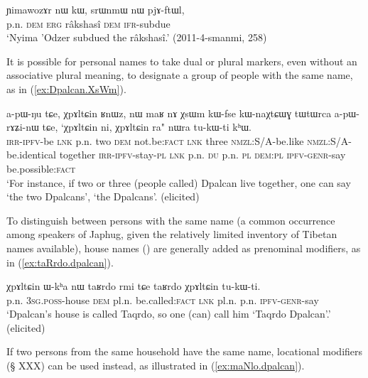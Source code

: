\begin{exe}
\ex \label{ex:Yimawodzer.NW}
 \gll  ɲimawozɤr nɯ kɯ, srɯnmɯ nɯ pjɤ-ftɯl, \\
 p.n. \textsc{dem} \textsc{erg} râkshasî \textsc{dem} \textsc{ifr}-subdue \\
 \glt `Nyima 'Odzer subdued the râkshasî.' (2011-4-smanmi, 258)
\end{exe}

It is possible for personal names to take dual or plural markers, even without an associative plural meaning, to designate a group of people with the same name, as in (\ref{ex:Dpalcan.XsWm}).

\begin{exe}
\ex \label{ex:Dpalcan.XsWm}
 \gll a-pɯ-ŋu tɕe, χpɤltɕin ʁnɯz, nɯ maʁ nɤ χsɯm kɯ-fse kɯ-naχtɕɯɣ tɯtɯrca a-pɯ-rɤʑi-nɯ tɕe, `χpɤltɕin ni, χpɤltɕin ra" nɯra tu-kɯ-ti kʰɯ. \\
 \textsc{irr}-\textsc{ipfv}-be \textsc{lnk} p.n. two \textsc{dem} not.be:\textsc{fact} \textsc{lnk} three \textsc{nmzl}:S/A-be.like \textsc{nmzl}:S/A-be.identical together \textsc{irr}-\textsc{ipfv}-stay-\textsc{pl} \textsc{lnk} p.n. \textsc{du} p.n. \textsc{pl} \textsc{dem}:\textsc{pl} \textsc{ipfv}-\textsc{genr}-say be.possible:\textsc{fact} \\ 
 \glt `For instance, if two or three (people called) Dpalcan live together, one can say `the two Dpalcans', `the Dpalcans'. (elicited)
\end{exe}

To distinguish between persons with the same name (a common occurrence among speakers of Japhug, given the relatively limited inventory of Tibetan names available), house names () are generally added as prenominal modifiers, as in (\ref{ex:taRrdo.dpalcan}).

\begin{exe}
\ex \label{ex:taRrdo.dpalcan}
\gll χpɤltɕin ɯ-kʰa nɯ taʁrdo rmi tɕe taʁrdo χpɤltɕin tu-kɯ-ti. \\
p.n. \textsc{3sg}.\textsc{poss}-house \textsc{dem} pl.n. be.called:\textsc{fact} \textsc{lnk} pl.n. p.n. \textsc{ipfv}-\textsc{genr}-say \\
\glt `Dpalcan's house is called Taqrdo, so one (can) call him `Taqrdo Dpalcan'.' (elicited)
\end{exe}

If  two persons from the same household have the same name, locational modifiers (§ XXX) can be used instead, as illustrated in (\ref{ex:maNlo.dpalcan}).

